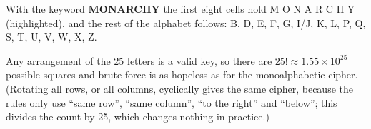 \begin{minipage}[c]{0.6\textwidth}
With the keyword \textbf{MONARCHY} the first eight cells hold M O N A R C H Y (highlighted), and the rest of the alphabet follows: B, D, E, F, G, I/J, K, L, P, Q, S, T, U, V, W, X, Z.

Any arrangement of the 25 letters is a valid key, so there are $25! \approx 1.55 \times 10^{25}$ possible squares and brute force is as hopeless as for the monoalphabetic cipher. (Rotating all rows, or all columns, cyclically gives the same cipher, because the rules only use ``same row'', ``same column'', ``to the right'' and ``below''; this divides the count by 25, which changes nothing in practice.)
\end{minipage}\hfill
\begin{minipage}[c]{0.36\textwidth}
\centering
{}
\end{minipage}

